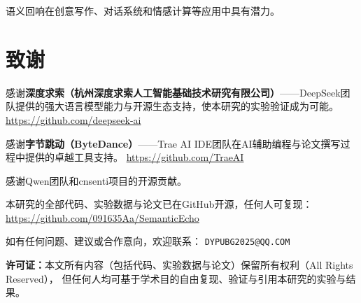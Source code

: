 \documentclass[a4paper, 11pt]{article}
\begin{document}
语义回响在创意写作、对话系统和情感计算等应用中具有潜力。

\section*{致谢}

感谢\textbf{深度求索（杭州深度求索人工智能基础技术研究有限公司）}——DeepSeek团队提供的强大语言模型能力与开源生态支持，使本研究的实验验证成为可能。
\hfill\url{https://github.com/deepseek-ai}

感谢\textbf{字节跳动（ByteDance）}——Trae AI IDE团队在AI辅助编程与论文撰写过程中提供的卓越工具支持。
\hfill\url{https://github.com/TraeAI}

感谢Qwen团队和cnsenti项目的开源贡献。

本研究的全部代码、实验数据与论文已在GitHub开源，任何人可复现：
\hfill\url{https://github.com/091635Aa/SemanticEcho}

如有任何问题、建议或合作意向，欢迎联系：
\hfill\texttt{DYPUBG2025@QQ.COM}

\vspace{0.3cm}
\noindent\textbf{许可证：}本文所有内容（包括代码、实验数据与论文）保留所有权利（All Rights Reserved），
但任何人均可基于学术目的自由复现、验证与引用本研究的实验与结果。



\end{document}
